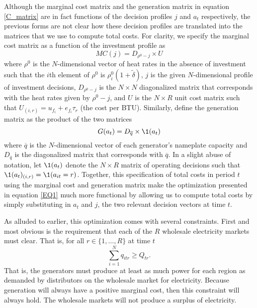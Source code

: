 Although the marginal cost matrix and the generation matrix in equation \eqref{C_matrix} are in fact functions of the decision profiles $j$ and $a_t$ respectively, the previous forms are not clear how these decision profiles are translated into the matrices that we use to compute total costs. For clarity, we specify the marginal cost matrix as a function of the investment profile as
\begin{equation}
    MC(j) = D_{\rho^0 - j} \times U
\end{equation}
where $\rho^0$ is the $N$-dimensional vector of heat rates in the absence of investment such that the $i$th element of $\rho^0$ is $\rho_i^0(1 + \tilde{\delta})$, $j$ is the given $N$-dimensional profile of investment decisions, $D_{\rho^0 - j}$ is the $N\times N$ diagonalized matrix that corresponds with the heat rates given by $\rho^0 - j$, and $U$ is the $N\times R$ unit cost matrix such that $U_{(i,r)} = u_{f_i} + e_{f_i}\tau_r$ (the cost per BTU). Similarly, define the generation matrix as the product of the two matrices
\begin{equation}
    G(a_t) = D_{\overline{q}} \times \1(a_t)
\end{equation}
where $\overline{q}$ is the $N$-dimensional vector of each generator's nameplate capacity and $D_{\overline{q}}$ is the diagonalized matrix that corresponds with $\overline{q}$. In a slight abuse of notation, let $\1(a_t)$ denote the $N\times R$ matrix of operating decisions such that $\1(a_t)_{(i,r)} = \1(a_{it} = r)$. Together, this specification of total costs in period $t$ using the marginal cost and generation matrix make the optimization presented in equation \eqref{EQ1} much more functional by allowing us to compute total costs by simply substituting in $a_t$ and $j$, the two relevant decision vectors at time $t$. 

As alluded to earlier, this optimization comes with several constraints. First and most obvious is the requirement that each of the $R$ wholesale electricity markets must clear. That is, for all $r \in \{1, \ldots, R\}$ at time $t$
\begin{equation}
    \sum_{i =1}^N q_{itr} \geq Q_{tr}. 
\end{equation}
That is, the generators must produce at least as much power for each region as demanded by distributors on the wholesale market for electricity. Because generation will always have a positive marginal cost, then this constraint will always hold. The wholesale markets will not produce a surplus of electricity.

